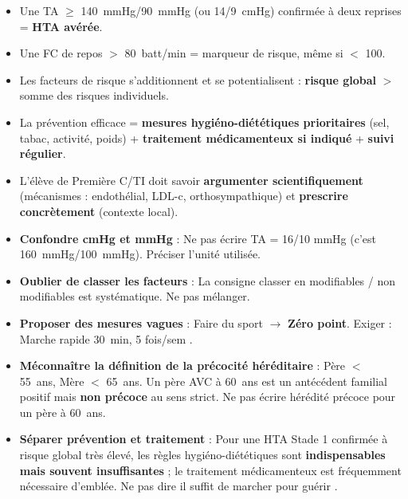 \documentclass[11pt]{article}
\begin{document}
\begin{aretenir}
\begin{itemize}
    \item Une TA $\ge$ \SI{140}{\mmHg}/\SI{90}{\mmHg} (ou 14/9~cmHg) confirmée à deux reprises = \textbf{HTA avérée}.
    \item Une FC de repos $>$ 80~batt/min = marqueur de risque, même si $<$ 100.
    \item Les facteurs de risque s'additionnent et se potentialisent : \textbf{risque global} $>$ somme des risques individuels.
    \item La prévention efficace = \textbf{mesures hygiéno-diététiques prioritaires} (sel, tabac, activité, poids) + \textbf{traitement médicamenteux si indiqué} + \textbf{suivi régulier}.
    \item L'élève de Première C/TI doit savoir \textbf{argumenter scientifiquement} (mécanismes : endothélial, LDL-c, orthosympathique) et \textbf{prescrire concrètement} (contexte local).
\end{itemize}
\end{aretenir}

\begin{attention}
\begin{itemize}
    \item \textbf{Confondre cmHg et mmHg} : Ne pas écrire \og TA = 16/10 mmHg \fg (c'est \SI{160}{\mmHg}/\SI{100}{\mmHg}). Préciser l'unité utilisée.
    \item \textbf{Oublier de classer les facteurs} : La consigne \og classer en modifiables / non modifiables \fg est systématique. Ne pas mélanger.
    \item \textbf{Proposer des mesures vagues} : \og Faire du sport \fg $\rightarrow$ \textbf{Zéro point}. Exiger : \og Marche rapide 30~min, 5 fois/sem \fg.
    \item \textbf{Méconnaître la définition de la précocité héréditaire} : Père $<$ 55~ans, Mère $<$ 65~ans. Un père AVC à 60~ans est un antécédent familial positif mais \textbf{non précoce} au sens strict. Ne pas écrire \og hérédité précoce \fg pour un père à 60~ans.
    \item \textbf{Séparer prévention et traitement} : Pour une HTA Stade 1 confirmée à risque global très élevé, les règles hygiéno-diététiques sont \textbf{indispensables mais souvent insuffisantes} ; le traitement médicamenteux est fréquemment nécessaire d'emblée. Ne pas dire \og il suffit de marcher pour guérir \fg.
\end{itemize}
\end{attention}
\end{document}
